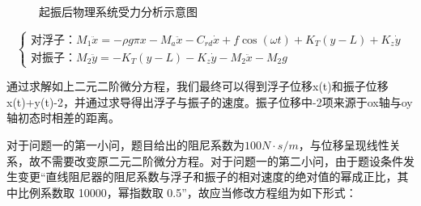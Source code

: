 \documentclass[12pt,utf8]{article}
\begin{document}
\begin{figure}[htbp]
	\centering
	\caption{起振后物理系统受力分析示意图}
\end{figure}


\begin{equation}
	\begin{cases}
		\text{对浮子：}M_1 \ddot{x} = - \rho g \pi x - M_a\ddot{x} - C_{rd}\dot{x} + f\cos (\omega t)  + K_T(y-L)+K_z \dot{y} \\
		\text{对振子：}M_2 \ddot{y} = -K_T (y-L)-K_z\dot{y}-M_2\ddot{x}-M_2 g
	\end{cases}
\end{equation}

通过求解如上二元二阶微分方程，我们最终可以得到浮子位移x(t)和振子位移x(t)+y(t)-2，并通过求导得出浮子与振子的速度。振子位移中-2项来源于ox轴与oy轴初态时相差的距离。

对于问题一的第一小问，题目给出的阻尼系数为$100N\cdot s/m$，与位移呈现线性关系，故不需要改变原二元二阶微分方程。对于问题一的第二小问，由于题设条件发生变更“直线阻尼器的阻尼系数与浮子和振子的相对速度的绝对值的幂成正比，其中比例系数取 10000，幂指数取 0.5”，故应当修改方程组为如下形式：
\end{document}
